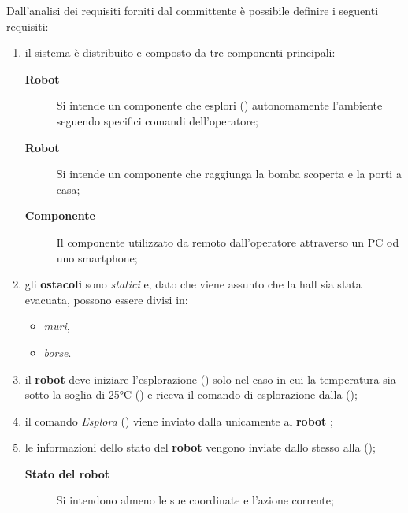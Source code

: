 

Dall'analisi dei requisiti forniti dal committente è possibile definire i seguenti requisiti:

\begin{enumerate}
  \item
    il sistema è distribuito e composto da tre componenti principali:
    \begin{description}
      \item[\textbf{Robot }] Si intende un componente che esplori () autonomamente l'ambiente seguendo specifici comandi dell'operatore;
      \item[\textbf{Robot }] Si intende un componente che raggiunga la bomba scoperta e la porti a casa;
      \item[\textbf{Componente }] Il componente utilizzato da remoto dall'operatore attraverso un PC od uno smartphone;
    \end{description}

  \item
    gli \textbf{ostacoli} sono \textit{statici} e, dato che viene assunto che la hall sia stata evacuata, possono essere divisi in:
    \begin{itemize}
      \item \textit{muri},
      \item \textit{borse}.
    \end{itemize}

  \item
    il \textbf{robot } deve iniziare l'esplorazione () solo nel caso in cui la temperatura sia sotto la soglia di 25°C () e riceva il comando di esplorazione dalla \textbf{} ();

  \item
    il comando \textit{Esplora} () viene inviato dalla \textbf{} unicamente al \textbf{robot };

  \item
    le informazioni dello stato del \textbf{robot } vengono inviate dallo stesso alla \textbf{} ();
    \begin{description}
      \item[\textbf{Stato del robot}] Si intendono almeno le sue coordinate e l'azione corrente;
    \end{description}


\end{enumerate}
